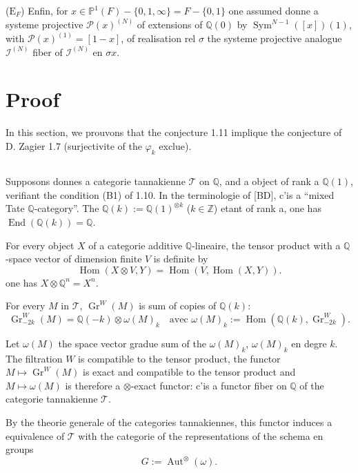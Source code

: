 \documentclass[12pt,a4paper]{article}
\theoremstyle{plain}
\theoremstyle{definition}
\theoremstyle{remark}
\DeclareMathOperator{\Hom}{Hom}
\DeclareMathOperator{\Sym}{Sym}
\DeclareMathOperator{\End}{End}
\DeclareMathOperator{\Aut}{Aut}
\newcommand{\Q}{\mathbb{Q}}
\newcommand{\Z}{\mathbb{Z}}
\newcommand{\IP}{\mathbb{P}}
\begin{document}
{($\text{E}_F$) Enfin, for $x\in\IP^1(F)-\{0,1,\infty\}=F-\{0,1\}$ one assumed donn{e} a syst{e}me projective $\mathcal{P}(x)^{(N)}$ of extensions of $\Q(0)$ by $\Sym^{N-1}([x])(1)$, with $\mathcal{P}(x)^{(1)}=[1-x]$, of r{e}alisation rel $\sigma$ the syst{e}me projective analogue $\mathcal{I}^{(N)}$ fiber of $\mathcal{I}^{(N)}$ en $\sigma x$.


\section{Proof}

In this section, we prouvons that the conjecture 1.11 implique the conjecture of D. Zagier 1.7 (surjectivit{e} of the $\varphi_k$ exclue).

\subsection{}

Supposons donn{e}s a cat{e}gorie tannakienne $\mathcal{T}$ on $\Q$, and a object of rank a $\Q(1)$, v{e}rifiant the condition (B1) of 1.10. In the terminologie of [BD], c'is a ``mixed Tate $\Q$-category''. The $\Q(k):=\Q(1)^{\otimes k}$ ($k\in\Z$) {e}tant of rank a, one has $\End(\Q(k))=\Q$.

For every object $X$ of a cat{e}gorie additive $\Q$-lin{e}aire, the tensor product with a $\Q$-space vector of dimension finite $V$ is d{e}finite by
\begin{equation*}
\Hom(X\otimes V, Y) = \Hom(V,\Hom(X,Y)).
\end{equation*}
one has $X\otimes\Q^n=X^n$.

For every $M$ in $\mathcal{T}$, $\operatorname{Gr}^W(M)$ is sum of copies of $\Q(k)$:
\begin{equation}\label{eq:2.1.1}
\operatorname{Gr}^W_{-2k}(M) = \Q(-k)\otimes\omega(M)_k \quad \text{avec } \omega(M)_k:=\Hom(\Q(k),\operatorname{Gr}^W_{-2k}).
\tag{2.1.1}
\end{equation}

Let $\omega(M)$ the space vector gradu{e} sum of the $\omega(M)_k$, $\omega(M)_k$ en degr{e} $k$. The filtration $W$ is compatible to the tensor product, the functor $M\mapsto\operatorname{Gr}^W(M)$ is exact and compatible to the tensor product and $M\mapsto\omega(M)$ is therefore a $\otimes$-exact functor: c'is a functor fiber on $\Q$ of the cat{e}gorie tannakienne $\mathcal{T}$.

By the th{e}orie g{e}n{e}rale of the cat{e}gories tannakiennes, this functor induces a {e}quivalence of $\mathcal{T}$ with the cat{e}gorie of the repr{e}sentations of the sch{e}ma en groups
\begin{equation}\label{eq:2.1.2}
G := \Aut^\otimes(\omega).
\tag{2.1.2}
\end{equation}

}
\end{document}
